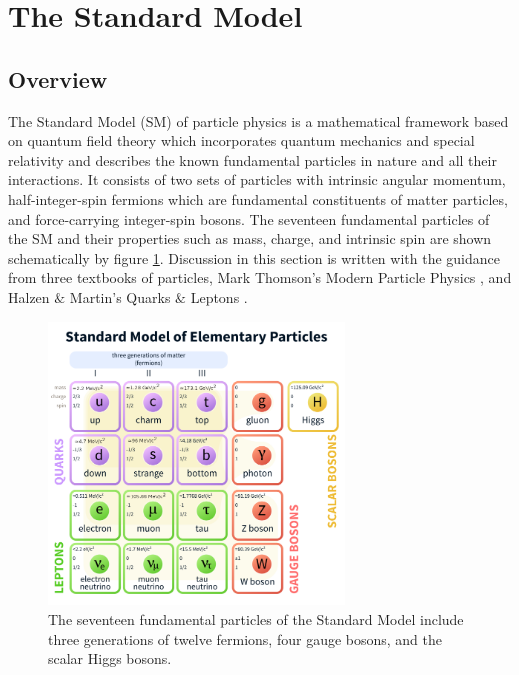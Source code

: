 \section{The Standard Model}

\label{sec:SM}
\subsection{Overview}
\label{subsec:Overview}
The Standard Model (SM) of particle physics is a mathematical framework based on quantum field theory which incorporates quantum mechanics and special relativity and describes the known fundamental particles in nature and all their interactions. It consists of two sets of particles with intrinsic angular momentum, half-integer-spin fermions which are fundamental constituents of matter particles, and force-carrying integer-spin bosons. The seventeen fundamental particles of the SM and their properties such as mass, charge, and intrinsic spin are shown schematically by figure \ref{fig:SM}. Discussion in this section is written with the guidance from three textbooks of particles, Mark Thomson's Modern Particle Physics \cite{Thomson:2013zua}, and Halzen $\&$ Martin's Quarks $\&$ Leptons \cite{Halzen:1984mc}.

\begin{figure}[H]
	\centering
    \includegraphics[width=0.7\textwidth] {figures/SMparticles.png}\hspace{1cm}
    \caption{ The seventeen fundamental particles of the Standard Model include three generations of twelve fermions, four gauge bosons, and the scalar Higgs bosons. \cite{SMFigureWiki}}
    \label{fig:SM}
\end{figure}

